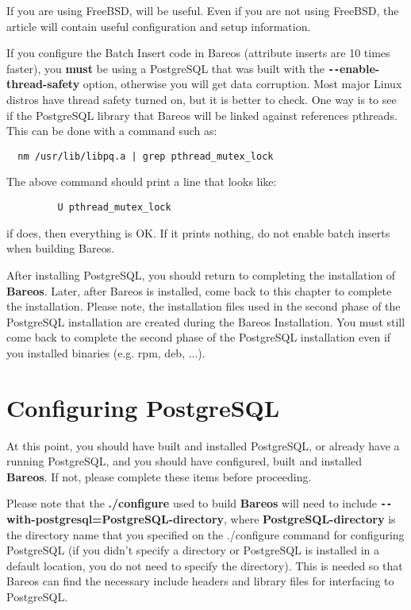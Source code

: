 If you are using FreeBSD,
will be useful. Even if you are not using FreeBSD, the article will contain
useful configuration and setup information.

If you configure the Batch Insert code in Bareos (attribute inserts are
10 times faster), you {\bf must} be using a PostgreSQL that was built with
the {\bf \verb:--:enable-thread-safety} option, otherwise you will get
data corruption. Most major Linux distros have thread safety turned on, but
it is better to check.  One way is to see if the PostgreSQL library that
Bareos will be linked against references pthreads.  This can be done
with a command such as:

\footnotesize
\begin{verbatim}
  nm /usr/lib/libpq.a | grep pthread_mutex_lock
\end{verbatim}
\normalsize

The above command should print a line that looks like:

\footnotesize
\begin{verbatim}
         U pthread_mutex_lock
\end{verbatim}
\normalsize

if does, then everything is OK. If it prints nothing, do not enable batch
inserts when building Bareos.

After installing PostgreSQL, you should return to completing the installation
of {\bf Bareos}. Later, after Bareos is installed, come back to this chapter
to complete the installation. Please note, the installation files used in the
second phase of the PostgreSQL installation are created during the Bareos
Installation. You must still come back to complete the second phase of the
PostgreSQL installation even if you installed binaries (e.g. rpm, deb,
...).


\section{Configuring PostgreSQL}

At this point, you should have built and installed PostgreSQL, or already have
a running PostgreSQL, and you should have configured, built and installed {\bf
Bareos}. If not, please complete these items before proceeding.

Please note that the {\bf ./configure} used to build {\bf Bareos} will need to
include {\bf \verb:--:with-postgresql=PostgreSQL-directory}, where {\bf
PostgreSQL-directory} is the directory name that you specified on the
./configure command for configuring PostgreSQL (if you didn't specify a
directory or PostgreSQL is installed in a default location, you do not need to
specify the directory). This is needed so that Bareos can find the necessary
include headers and library files for interfacing to PostgreSQL.

